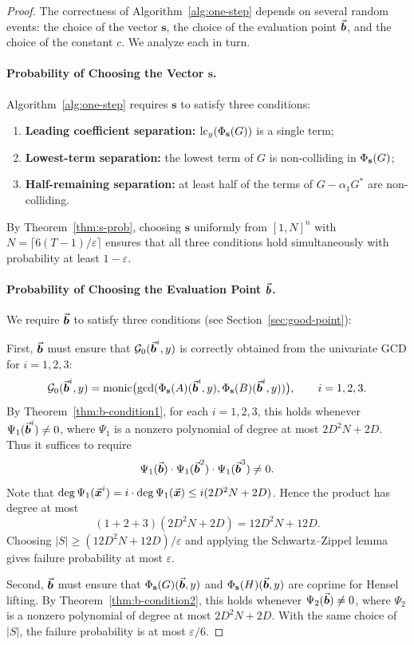 \documentclass{article}
\numberwithin{equation}{section}
\begin{document}
\begin{proof}
The correctness of Algorithm~\ref{alg:one-step} depends on several random events: the choice of the vector $\mathbf{s}$, the choice of the evaluation point $\vec{\boldsymbol{b}}$, and the choice of the constant $c$. We analyze each in turn.

\paragraph{Probability of Choosing the Vector $\mathbf{s}$.}
Algorithm~\ref{alg:one-step} requires $\mathbf{s}$ to satisfy three conditions:
\begin{enumerate}
    \item \textbf{Leading coefficient separation:} $\operatorname{lc}_y(\Phi_{\mathbf{s}}(G))$ is a single term;
    \item \textbf{Lowest-term separation:} the lowest term of $G$ is non-colliding in $\Phi_{\mathbf{s}}(G)$;
    \item \textbf{Half-remaining separation:} at least half of the terms of $G - \alpha_1 G^*$ are non-colliding.
\end{enumerate}
By Theorem~\ref{thm:s-prob}, choosing $\mathbf{s}$ uniformly from $[1,N]^n$ with $N = \lceil 6(T-1)/\varepsilon \rceil$ ensures that all three conditions hold simultaneously with probability at least $1 - \varepsilon$.

\paragraph{Probability of Choosing the Evaluation Point $\vec{\boldsymbol{b}}$.}
We require $\vec{\boldsymbol{b}}$ to satisfy three conditions (see Section~\ref{sec:good-point}):

First, $\vec{\boldsymbol{b}}$ must ensure that $\mathcal{G}_0(\vec{\boldsymbol{b}}^i,y)$ is correctly obtained from the univariate GCD for $i=1,2,3$:
\[
\mathcal{G}_0(\vec{\boldsymbol{b}}^i,y) = \operatorname{monic}\bigl( \gcd( \Phi_{\mathbf{s}}(A)(\vec{\boldsymbol{b}}^i,y), \Phi_{\mathbf{s}}(B)(\vec{\boldsymbol{b}}^i,y) ) \bigr),\qquad i=1,2,3.
\]
By Theorem~\ref{thm:b-condition1}, for each $i=1,2,3$, this holds whenever $\Psi_1(\vec{\boldsymbol{b}}^i) \neq 0$, where $\Psi_1$ is a nonzero polynomial of degree at most $2D^2N + 2D$. Thus it suffices to require
\[
\Psi_1(\vec{\boldsymbol{b}})\cdot \Psi_1(\vec{\boldsymbol{b}}^2)\cdot \Psi_1(\vec{\boldsymbol{b}}^3) \neq 0.
\]
Note that $\deg \Psi_1(\vec{\boldsymbol{x}}^i) = i \cdot \deg \Psi_1(\vec{\boldsymbol{x}}) \le i(2D^2N + 2D)$. Hence the product has degree at most
\[
(1+2+3)(2D^2N + 2D) = 12D^2N + 12D.
\]
Choosing $|S| \ge (12D^2N + 12D)/\varepsilon$ and applying the Schwartz--Zippel lemma gives failure probability at most $\varepsilon$.

Second, $\vec{\boldsymbol{b}}$ must ensure that $\Phi_{\mathbf{s}}(G)(\vec{\boldsymbol{b}},y)$ and $\Phi_{\mathbf{s}}(H)(\vec{\boldsymbol{b}},y)$ are coprime for Hensel lifting. By Theorem~\ref{thm:b-condition2}, this holds whenever $\Psi_2(\vec{\boldsymbol{b}}) \neq 0$, where $\Psi_2$ is a nonzero polynomial of degree at most $2D^2N + 2D$. With the same choice of $|S|$, the failure probability is at most $\varepsilon/6$.


\end{proof}
\end{document}
